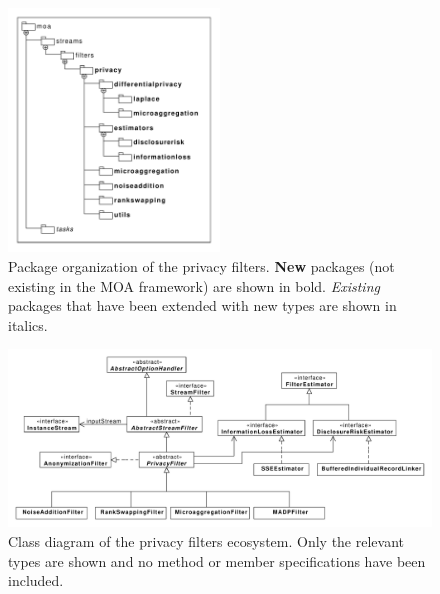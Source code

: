 \begin{figure}
	\centering
	\includegraphics[width=0.5\textwidth]{figures/moa-ppsm-packages.pdf}
	\caption[Package diagram of the privacy filters ecosystem.]{Package organization of the privacy filters. \textbf{New} packages (not existing in the MOA framework) are shown in bold. \textit{Existing} packages that have been extended with new types are shown in italics.}
	\label{fig:moa-ppsm-packages}
\end{figure}

\begin{figure}
	\centering
	\includegraphics[width=1.0\textwidth]{figures/refactored-ppsm-class-diagram.pdf}
	\caption[Class diagram of the privacy filters ecosystem.]{Class diagram of the privacy filters ecosystem. Only the relevant types are shown and no method or member specifications have been included.}
	\label{fig:moa-ppsm-class-uml}
\end{figure}